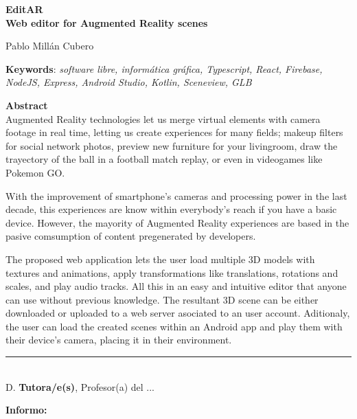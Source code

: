 \cleardoublepage

\begin{center}
	{\large\bfseries EditAR \\ Web editor for Augmented Reality scenes}\\
\end{center}
\begin{center}
	Pablo Millán Cubero\\
\end{center}
\vspace{0.5cm}
\noindent\textbf{Keywords}: \textit{software libre, informática gráfica, Typescript, React, Firebase, NodeJS, Express, Android Studio, Kotlin, Sceneview, GLB}
\vspace{0.7cm}

\noindent\textbf{Abstract}\\
Augmented Reality technologies let us merge virtual elements with camera footage in real time, letting us create experiences for many fields; makeup filters for social network photos, preview new furniture for your livingroom, draw the trayectory of the ball in a football match replay, or even in videogames like Pokemon GO.

With the improvement of smartphone's cameras and processing power in the last decade, this experiences are know within everybody's reach if you have a basic device. However, the mayority of Augmented Reality experiences are based in the pasive comsumption of content pregenerated by developers.

The proposed web application lets the user load multiple 3D models with textures and animations, apply transformations like translations, rotations and scales, and play audio tracks. All this in an easy and intuitive editor that anyone can use without previous knowledge. The resultant 3D scene can be either downloaded or uploaded to a web server asociated to an user account. Aditionaly, the user can load the created scenes within an Android app and play them with their device's camera, placing it in their environment.


\cleardoublepage

\thispagestyle{empty}

\noindent\rule[-1ex]{\textwidth}{2pt}\\[4.5ex]

D. \textbf{Tutora/e(s)}, Profesor(a) del ...

\vspace{0.5cm}

\textbf{Informo:}

